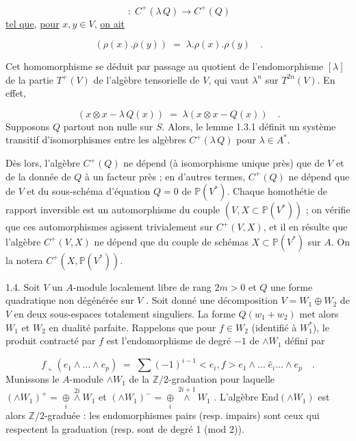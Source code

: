 \begin{equation*}
[\lambda] \;:\; C^{+}(\lambda\, Q) \longrightarrow C^{+}(Q)
\end{equation*}
\underline{tel que}, \underline{pour} $x, y \in V$, \underline{on ait}

\begin{equation*}
[\lambda]\,(\rho(x).\rho(y)) \;=\; \lambda.\rho(x).\rho(y) \quad .
\end{equation*}


Cet homomorphisme se déduit par passage au quotient de l'endomorphisme $[\lambda]$ de la partie $T^{+}(V)$ de l'algèbre tensorielle de $V$, qui vaut $\lambda^{n}$ sur $T^{2n}(V)$. En effet,

\begin{equation*}
[\lambda]\,(x \otimes x - \lambda\, Q(x)) \;=\; \lambda(x \otimes x - Q(x)) \quad .
\end{equation*}
Supposons $Q$ partout non nulle sur $S$. Alors, le lemme 1.3.1 définit un système transitif d'isomorphismes entre les algèbres $C^{+}(\lambda\, Q)$ pour $\lambda \in A^{*}$.

Dès lors, l'algèbre $C^{+}(Q)$ ne dépend (à isomorphisme unique près) que de $V$ et de la donnée de $Q$ à un facteur près ; en d'autres termes, $C^{+}(Q)$ ne dépend que de $V$ et du sous-schéma d'équation $Q = 0$ de $\mathbb{P}(V^{*})$. Chaque homothétie de rapport inversible est un automorphisme du couple $(V, X \subset \mathbb{P}(V^{*}))$ ; on vérifie que ces automorphismes agissent trivialement sur $C^{+}(V, X)$, et il en résulte que l'algèbre $C^{+}(V, X)$ ne dépend que du couple de schémas $X \subset \mathbb{P}(V^{*})$ sur $A$. On la notera $C^{+}(X, \mathbb{P}(V^{*}))$.

1.4. Soit $V$ un $A$-module localement libre de rang $2m > 0$ et $Q$ une forme quadratique non dégénérée sur $V$ . Soit donné une décomposition $V = W_1 \oplus W_2$ de $V$ en deux sous-espaces totalement singuliers. La forme $Q(w_1 + w_2)$ met alors $W_1$ et $W_2$ en dualité parfaite. Rappelons que pour $f \in W_2$ (identifié à $W_1^{*}$), le produit contracté par $f$ est l'endomorphisme de degré $-1$ de $\wedge W_1$ défini par

\begin{equation*}
f \llcorner (e_1 \wedge \ldots \wedge e_p) \;=\; \sum (-1)^{i-1} < e_i , f > e_1 \wedge \ldots \; \hat{e}_i \ldots \wedge e_p \quad .
\end{equation*}
Munissons le $A$-module $\wedge W_1$ de la $\mathbb{Z}/2$-graduation pour laquelle
$(\wedge W_1)^+ = \underset{i}{\oplus} \overset{2i}{\wedge} W_1$ et $(\wedge W_1)^- = \underset{i}{\oplus} \overset{2i+1}{\wedge} W_1$ . L'algèbre $\mathrm{End}(\wedge W_1)$ est alors $\mathbb{Z}/2$-graduée : les endomorphismes pairs (resp. impairs) sont ceux qui respectent la graduation (resp. sont de degré 1 (mod 2)).

